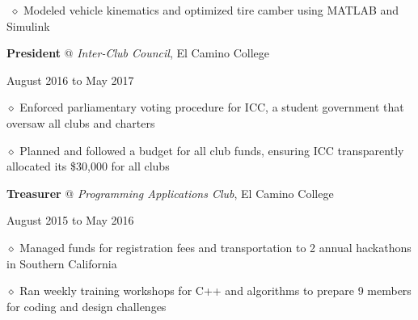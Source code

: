 \documentclass [11pt]{article}
\begin{document}
\begin{flushleft}
‭‭%
\quad\quad\quad$\diamond$ Modeled vehicle kinematics and optimized tire camber using MATLAB and Simulink

\linebreak
\textbf{President} @ \emph{Inter-Club Council}, El Camino College \begin{minipage}{0.565 \linewidth}\begin{flushright}August 2016 to May 2017\end{flushright}\end{minipage}

‭‭\quad\quad\quad$\diamond$ Enforced parliamentary voting procedure for ICC, a student government that oversaw all clubs and charters

‭‭\quad\quad\quad$\diamond$ Planned and followed a budget for all club funds, ensuring ICC transparently allocated its \$30,000 for all clubs

\linebreak
\textbf{Treasurer} @ \emph{Programming Applications Club}, El Camino College \begin{minipage}{0.450 \linewidth}\begin{flushright}August 2015 to May 2016\end{flushright}\end{minipage}

‭‭\quad\quad\quad$\diamond$ Managed funds for registration fees and transportation to 2 annual hackathons in Southern California

‭‭\quad\quad\quad$\diamond$ Ran weekly training workshops for C++ and algorithms to prepare 9 members for coding and design challenges




\end{flushleft}
\end{document}
